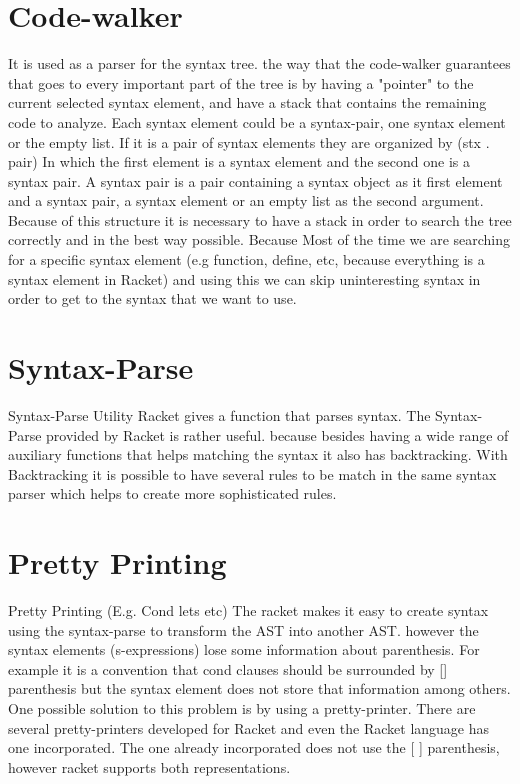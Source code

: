 \section{Code-walker} %
It is used as a parser for the syntax tree.
the way that the code-walker guarantees that goes to every important part of the
tree is by having a "pointer" to the current selected syntax element, and have
a stack that contains the remaining code to analyze.
Each syntax element could be a syntax-pair, one syntax element or the empty list.
If it is a pair of syntax elements they are organized by (stx . pair)
In which the first element is a syntax element and the second one is a syntax pair.
A syntax pair is a pair containing a syntax object as it first element and
a syntax pair, a syntax element or an empty list as the second argument.
Because of this structure it is necessary to have a stack in order to search
the tree correctly and in the best way possible.
Because Most of the time we are searching for a specific syntax element (e.g function,
define, etc, because everything is a syntax element in Racket) and using this we
can skip uninteresting syntax in order to get to the syntax that we want to use.

\section{Syntax-Parse}
Syntax-Parse Utility
Racket gives a function that parses syntax. The Syntax-Parse provided by Racket
is rather useful. because besides having a wide range of auxiliary functions that
helps matching the syntax it also has backtracking. With Backtracking it is
possible to have several rules to be match in the same syntax parser which
helps to create more sophisticated rules.


\section{ Pretty Printing}

Pretty Printing (E.g. Cond lets etc)
The racket makes it easy to create syntax using the syntax-parse to transform the
AST into another AST. however the syntax elements (s-expressions) lose some information
about parenthesis. For example it is a convention that cond clauses should be
surrounded by [] parenthesis but the syntax element does not store that information
 among others. One possible solution to this problem is by using a pretty-printer.
 There are several pretty-printers developed for Racket and even the Racket language
 has one incorporated.
 The one already incorporated does not use the [ ] parenthesis, however racket
 supports both representations.

